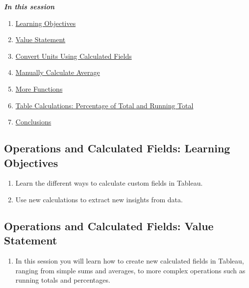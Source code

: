 \documentclass[
]{book}
\providecommand{\tightlist}{%
  \setlength{\itemsep}{0pt}\setlength{\parskip}{0pt}}
\begin{document}
\textbf{\emph{In this session}}

\begin{enumerate}
\def\labelenumi{\arabic{enumi}.}
\tightlist
\item
  \protect\hyperlink{operations-and-calculated-fields-learning-objectives}{Learning Objectives}
\item
  \protect\hyperlink{operations-and-calculated-fields-value-statement}{Value Statement}
\item
  \protect\hyperlink{convert-units-using-calculated-fields}{Convert Units Using Calculated Fields}
\item
  \protect\hyperlink{manually-calculate-average}{Manually Calculate Average}
\item
  \protect\hyperlink{more-functions}{More Functions}
\item
  \protect\hyperlink{table-calculations-percentage-of-total-and-running-total}{Table Calculations: Percentage of Total and Running Total}
\item
  \protect\hyperlink{operations-and-calculated-fields-conclusions}{Conclusions}
\end{enumerate}

\hypertarget{operations-and-calculated-fields-learning-objectives}{%
\subsection{Operations and Calculated Fields: Learning Objectives}\label{operations-and-calculated-fields-learning-objectives}}

\begin{enumerate}
\def\labelenumi{\arabic{enumi}.}
\tightlist
\item
  Learn the different ways to calculate custom fields in Tableau.
\item
  Use new calculations to extract new insights from data.
\end{enumerate}

\hypertarget{operations-and-calculated-fields-value-statement}{%
\subsection{Operations and Calculated Fields: Value Statement}\label{operations-and-calculated-fields-value-statement}}

\begin{enumerate}
\def\labelenumi{\arabic{enumi}.}
\tightlist
\item
  In this session you will learn how to create new calculated fields in Tableau, ranging from simple sums and averages, to more complex operations such as running totals and percentages.
\end{enumerate}
\end{document}
